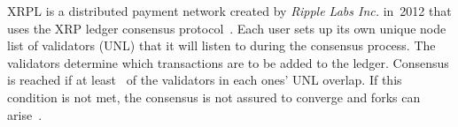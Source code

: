 

XRPL is a distributed payment network created by \textit{Ripple Labs Inc.} in~2012 that uses the XRP ledger consensus protocol~\cite{Chase2018}.
Each user sets up its own unique node list of validators (UNL) that it will listen to during the consensus process. 
The validators determine which transactions are to be added to the ledger. 
Consensus is reached if at least~ of the validators in each ones' UNL overlap. If this condition is not met, the consensus is not assured to converge and forks can arise~\cite{Chase2018}.






